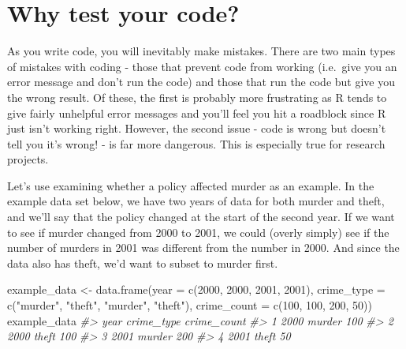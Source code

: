 \documentclass[
]{krantz}
\makeatletter
\newenvironment{Shaded}{\begin{snugshade}}{\end{snugshade}}
\newcommand{\AttributeTok}[1]{\textcolor[rgb]{0.61,0.61,0.61}{#1}}
\newcommand{\CommentTok}[1]{\textcolor[rgb]{0.37,0.37,0.37}{\textit{#1}}}
\newcommand{\DecValTok}[1]{\textcolor[rgb]{0.06,0.06,0.06}{#1}}
\newcommand{\FunctionTok}[1]{\textcolor[rgb]{0,0,0}{#1}}
\newcommand{\NormalTok}[1]{#1}
\newcommand{\OtherTok}[1]{\textcolor[rgb]{0.37,0.37,0.37}{#1}}
\newcommand{\StringTok}[1]{\textcolor[rgb]{0.5,0.5,0.5}{#1}}
\newenvironment{kframe}{%
\medskip{}
\setlength{\fboxsep}{.8em}
 \def\at@end@of@kframe{}%
 \ifinner\ifhmode%
  \def\at@end@of@kframe{\end{minipage}}%
  \begin{minipage}{\columnwidth}%
 \fi\fi%
 \def\FrameCommand##1{\hskip\@totalleftmargin \hskip-\fboxsep
 \colorbox{shadecolor}{##1}\hskip-\fboxsep
     \hskip-\linewidth \hskip-\@totalleftmargin \hskip\columnwidth}%
 \MakeFramed {\advance\hsize-\width
   \@totalleftmargin\z@ \linewidth\hsize
   \@setminipage}}%
 {\par\unskip\endMakeFramed%
 \at@end@of@kframe}
\renewenvironment{Shaded}{\begin{kframe}}{\end{kframe}}
\makeatother
\begin{document}
\hypertarget{why-test-your-code}{%
\section{Why test your code?}\label{why-test-your-code}}

As you write code, you will inevitably make mistakes. There are two main types of mistakes with coding - those that prevent code from working (i.e.~give you an error message and don't run the code) and those that run the code but give you the wrong result. Of these, the first is probably more frustrating as R tends to give fairly unhelpful error messages and you'll feel you hit a roadblock since R just isn't working right. However, the second issue - code is wrong but doesn't tell you it's wrong! - is far more dangerous. This is especially true for research projects.

Let's use examining whether a policy affected murder as an example. In the example data set below, we have two years of data for both murder and theft, and we'll say that the policy changed at the start of the second year. If we want to see if murder changed from 2000 to 2001, we could (overly simply) see if the number of murders in 2001 was different from the number in 2000. And since the data also has theft, we'd want to subset to murder first.

\begin{Shaded}
\begin{Highlighting}[]
\NormalTok{example\_data }\OtherTok{\textless{}{-}} \FunctionTok{data.frame}\NormalTok{(}\AttributeTok{year =} \FunctionTok{c}\NormalTok{(}\DecValTok{2000}\NormalTok{, }\DecValTok{2000}\NormalTok{, }\DecValTok{2001}\NormalTok{, }\DecValTok{2001}\NormalTok{),}
                           \AttributeTok{crime\_type =} \FunctionTok{c}\NormalTok{(}\StringTok{"murder"}\NormalTok{, }\StringTok{"theft"}\NormalTok{, }\StringTok{"murder"}\NormalTok{, }\StringTok{"theft"}\NormalTok{),}
                           \AttributeTok{crime\_count =} \FunctionTok{c}\NormalTok{(}\DecValTok{100}\NormalTok{, }\DecValTok{100}\NormalTok{, }\DecValTok{200}\NormalTok{, }\DecValTok{50}\NormalTok{))}
\NormalTok{example\_data}
\CommentTok{\#\textgreater{}   year crime\_type crime\_count}
\CommentTok{\#\textgreater{} 1 2000     murder         100}
\CommentTok{\#\textgreater{} 2 2000      theft         100}
\CommentTok{\#\textgreater{} 3 2001     murder         200}
\CommentTok{\#\textgreater{} 4 2001      theft          50}
\end{Highlighting}
\end{Shaded}
\end{document}
